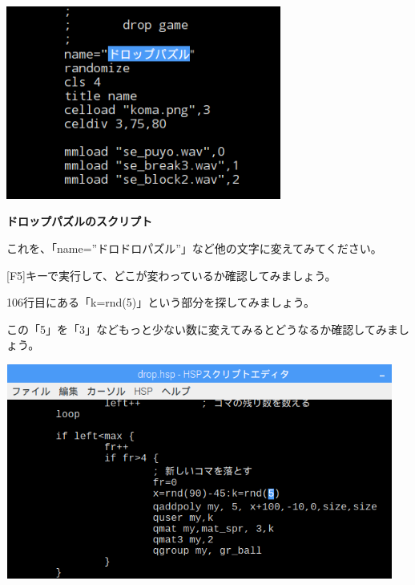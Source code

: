 \documentclass[a4paper,dvipdfmx]{jarticle}
\newcommand\textstyleqwerty[1]{#1}
\begin{document}
\begin{center}
\includegraphics[width=9.049cm,height=6.346cm]{text02-img/text02-img014.png}

\end{center}

\bigskip


\bigskip


\bigskip


\bigskip


\bigskip


\bigskip


\bigskip


\bigskip


\bigskip


\bigskip

\textstyleqwerty{\textbf{ドロップパズルのスクリプト}}


\bigskip


\bigskip


\bigskip


\bigskip

\textstyleqwerty{これを、「name=”}ドロドロパズル\textstyleqwerty{”」など他の文字に変えてみてください。}

[F5]キーで実行して、どこが変わっているか確認してみましょう。


\bigskip

106行目にある「k=rnd(5)」という部分を探してみましょう。

この「5」を「3」などもっと少ない数に変えてみるとどうなるか確認してみましょう。


\bigskip

\includegraphics[width=12.753cm,height=7.064cm]{text02-img/text02-img041.png}
 
\end{document}
